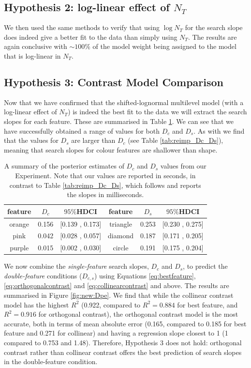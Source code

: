 \documentclass[preprint,12pt,authoryear]{elsarticle}
\begin{document}
\subsection{Hypothesis 2: log-linear effect of $N_T$}

We then used the same methods to verify that using $\log{N_T}$ for the search slope does indeed give a better fit to the data than simply using $N_T$. The results are again conclusive with $\sim100\%$ of the model weight being assigned to the model that is log-linear in $N_T$. 

\subsection{Hypothesis 3: Contrast Model Comparison}

Now that we have confirmed that the shifted-lognormal multilevel model (with a log-linear effect of $N_T$) is indeed the best fit to the data we will extract the search slopes for each feature. These are summarised in Table \ref{tab:new_Dc_Ds}. We can see that we have successfully obtained a range of values for both $D_c$ and $D_s$. As with \cite{buetti2019predicting} we find that the values for $D_s$ are larger than $D_c$ (see Table \ref{tab:reimp_Dc_Ds}), meaning that search slopes for colour features are shallower than shape. 

\begin{table}[h]
\centering
\begin{tabular}{|c|cc||c|cc|} 
\hline
feature & $D_c$ & $95\%$HDCI &feature &$D_s$  &$95\%$HDCI \\
 \hline 
orange & 0.156 &  [0.139 ,  0.173] & triangle  &  0.253  & [0.230  , 0.275]\\
pink  &  0.042 &  [0.028 , 0.057] & diamond& 0.187 &  [0.171 ,  0.205]\\
purple & 0.015 &  [0.002  , 0.030] & circle & 0.191  & [0.175 , 0.204]\\
 \hline 
 \end{tabular}
\caption{A summary of the posterior estimates of $D_c$ and $D_s$ values from our Experiment. Note that our values are reported in seconds, in contrast to Table  \ref{tab:reimp_Dc_Ds}, which follows \citep{buetti2019predicting} and reports the slopes in milliseconds.}
\label{tab:new_Dc_Ds}
\end{table}

We now combine the \textit{single-feature} search slopes, $D_c$ and $D_s$, to predict the \textit{double-feature} conditions ($D_{c,s}$) using Equations \ref{eq:bestfeature},  \ref{eq:orthogonalcontrast} and \ref{eq:collinearcontrast} and above. The results are summarised in Figure \ref{fig:new:Dpe}. We find that while the collinear contrast model has the highest $R^2$ (0.922, compared to $R^2=0.884$ for best feature, and $R^2=0.916$ for orthogonal contrast), the orthogonal contrast model is the most accurate, both in terms of mean absolute error (0.165, compared to 0.185 for best feature and 0.271 for collinear) and having a regression slope closest to 1 (1 compared to 0.753 and 1.48). Therefore, Hypothesis 3 does not hold: orthogonal contrast rather than collinear contrast offers the best prediction of search slopes in the double-feature condition.  
\end{document}
